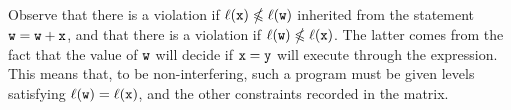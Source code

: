 Observe that there is a violation if \(\ell(\mathtt{x}) \nleqslant \ell(\mathtt{w})\) inherited from the statement $\mathtt{w}=\mathtt{w} + \mathtt{x}$, and that there is a violation if \(\ell(\mathtt{w}) \nleqslant \ell(\mathtt{x})\).
The latter comes from the fact that the value of \(\mathtt{w}\) will decide if \(\mathtt{x}=\mathtt{y}\) will execute through the expression.
This means that, to be non-interfering, such a program must be given levels satisfying \(\ell(\mathtt{w}) = \ell(\mathtt{x})\), and the other constraints recorded in the matrix.


